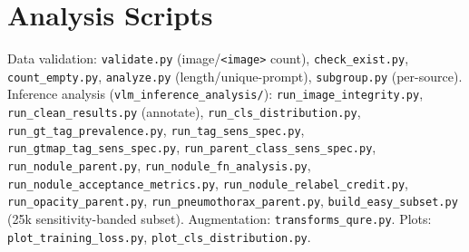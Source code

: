 \documentclass[11pt,a4paper]{article}
\begin{document}
\section{Analysis Scripts}
\label{app:scripts}
Data validation: \texttt{validate.py} (image/\texttt{<image>} count), \texttt{check\_exist.py}, \texttt{count\_empty.py}, \texttt{analyze.py} (length/unique-prompt), \texttt{subgroup.py} (per-source). Inference analysis (\texttt{vlm\_inference\_analysis/}): \texttt{run\_image\_integrity.py}, \texttt{run\_clean\_results.py} (annotate), \texttt{run\_cls\_distribution.py}, \texttt{run\_gt\_tag\_prevalence.py}, \texttt{run\_tag\_sens\_spec.py}, \texttt{run\_gtmap\_tag\_sens\_spec.py}, \texttt{run\_parent\_class\_sens\_spec.py}, \texttt{run\_nodule\_parent.py}, \texttt{run\_nodule\_fn\_analysis.py}, \texttt{run\_nodule\_acceptance\_metrics.py}, \texttt{run\_nodule\_relabel\_credit.py}, \texttt{run\_opacity\_parent.py}, \texttt{run\_pneumothorax\_parent.py}, \texttt{build\_easy\_subset.py} (25k sensitivity-banded subset). Augmentation: \texttt{transforms\_qure.py}. Plots: \texttt{plot\_training\_loss.py}, \texttt{plot\_cls\_distribution.py}.
\end{document}
